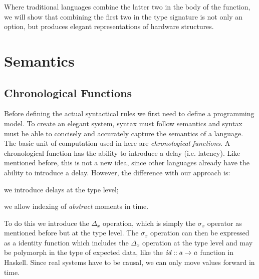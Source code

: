 Where traditional languages combine the latter two in the body of the function, we will show that combining the first two in the type signature is not only an option, but produces elegant representations of hardware structures.

\section{Semantics}
\subsection{Chronological Functions}
Before defining the actual syntactical rules we first need to define a programming model.
To create an elegant system, syntax must follow semantics and syntax must be able to concisely and accurately capture the semantics of a language.
The basic unit of computation used in here are \textit{chronological functions}.
A chronological function has the ability to introduce a delay (i.e. latency).
Like mentioned before, this is not a new idea, since other languages already have the ability to introduce a delay.
However, the difference with our approach is:
\begin{inparaenum}
\item we introduce delays at the type level;
\item we allow indexing of \textit{abstract} moments in time.
\end{inparaenum}
To do this we introduce the \ensuremath{\Delta_x} operation, which is simply the \ensuremath{\sigma_x} operator as mentioned before but at the type level.
The \ensuremath{\sigma_x} operation can then be expressed as a identity function which includes the \ensuremath{\Delta_x} operation at the type level and may be polymorph in the type of expected data, like the \ensuremath{\Varid{id}\mathbin{::}\Varid{a}\to \Varid{a}} function in Haskell.
Since real systems have to be causal, we can only move values forward in time.

